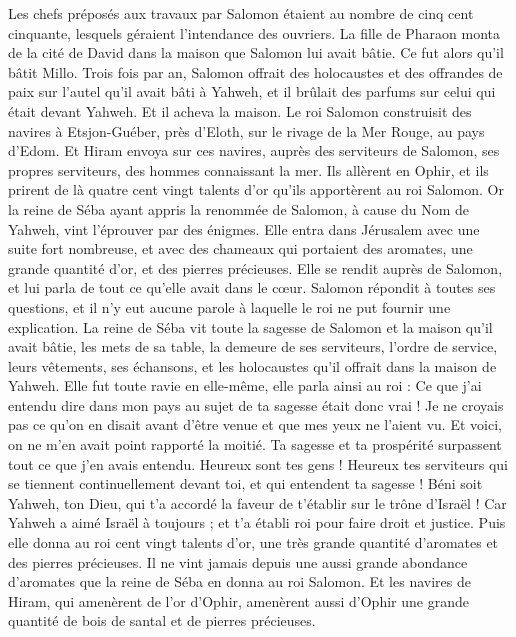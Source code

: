 \begin{multicols}{2}
Les chefs préposés aux travaux par Salomon étaient au nombre de cinq cent cinquante, lesquels géraient l'intendance des ouvriers.
La fille de Pharaon monta de la cité de David dans la maison que Salomon lui avait bâtie. Ce fut alors qu'il bâtit Millo.
Trois fois par an, Salomon offrait des holocaustes et des offrandes de paix sur l'autel qu'il avait bâti à Yahweh, et il brûlait des parfums sur celui qui était devant Yahweh. Et il acheva la maison.
Le roi Salomon construisit des navires à Etsjon-Guéber, près d'Eloth, sur le rivage de la Mer Rouge, au pays d'Edom.
Et Hiram envoya sur ces navires, auprès des serviteurs de Salomon, ses propres serviteurs, des hommes connaissant la mer.
Ils allèrent en Ophir, et ils prirent de là quatre cent vingt talents d'or qu'ils apportèrent au roi Salomon.
\VerseOne{}Or la reine de Séba ayant appris la renommée de Salomon, à cause du Nom de Yahweh, vint l'éprouver par des énigmes.
Elle entra dans Jérusalem avec une suite fort nombreuse, et avec des chameaux qui portaient des aromates, une grande quantité d'or, et des pierres précieuses. Elle se rendit auprès de Salomon, et lui parla de tout ce qu'elle avait dans le cœur.
Salomon répondit à toutes ses questions, et il n'y eut aucune parole à laquelle le roi ne put fournir une explication.
La reine de Séba vit toute la sagesse de Salomon et la maison qu'il avait bâtie,
les mets de sa table, la demeure de ses serviteurs, l'ordre de service, leurs vêtements, ses échansons, et les holocaustes qu'il offrait dans la maison de Yahweh.
Elle fut toute ravie en elle-même, elle parla ainsi au roi : Ce que j'ai entendu dire dans mon pays au sujet de ta sagesse était donc vrai !
Je ne croyais pas ce qu'on en disait avant d'être venue et que mes yeux ne l'aient vu. Et voici, on ne m'en avait point rapporté la moitié. Ta sagesse et ta prospérité surpassent tout ce que j'en avais entendu.
Heureux sont tes gens ! Heureux tes serviteurs qui se tiennent continuellement devant toi, et qui entendent ta sagesse !
Béni soit Yahweh, ton Dieu, qui t'a accordé la faveur de t'établir sur le trône d'Israël ! Car Yahweh a aimé Israël à toujours ; et t'a établi roi pour faire droit et justice.
Puis elle donna au roi cent vingt talents d'or, une très grande quantité d'aromates et des pierres précieuses. Il ne vint jamais depuis une aussi grande abondance d'aromates que la reine de Séba en donna au roi Salomon.
Et les navires de Hiram, qui amenèrent de l'or d'Ophir, amenèrent aussi d'Ophir une grande quantité de bois de santal et de pierres précieuses.

\end{multicols}
